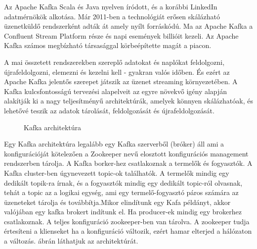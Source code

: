 
Az Apache Kafka Scala és Java nyelven íródott, és a korábbi LinkedIn adatmérnökök alkotása. Már 2011-ben a technológiát erősen skálázható üzenetküldő rendszerként adták át amely nyílt forráskódú. Ma az Apache Kafka a Confluent Stream Platform része és napi események billióit kezeli. Az Apache Kafka számos megbízható társasággal körbeépítette magát a piacon.

A mai összetett rendszerekben szereplő adatokat és naplókat feldolgozni, újrafeldolgozni, elemezni és kezelni kell - gyakran valós időben. És ezért az Apache Kafka jelentős szerepet játszik az üzenet streaming környezetében. A Kafka kulcsfontosságú tervezési alapelveit az egyre növekvő igény alapján alakítják ki a nagy teljesítményű architektúrák, amelyek könnyen skálázhatóak, és lehetővé teszik az adatok tárolását, feldolgozását és újrafeldolgozását.

 \begin{figure}[ht]
	\centering
	\caption{Kafka architektúra} 
	\label{fig:kafka-architecture}
\end{figure}
Egy Kafka architektúra legalább egy Kafka szerverből (bróker) áll ami a konfigurációját kötelezően a Zookeeper nevű elosztott konfigurációs management rendszerben tárolja.  A Kafka borker-hez csatlakoznak a termelők és fogyasztók. A Kafka cluster-ben úgynevezett topic-ok találhatók. A termelők mindig egy dedikált topik-ra írnak, és a fogyasztók mindig egy dedikált topic-ról olvasnak, tehát a topic az a logikai egység, ami egy termelő-fogyasztó páros számára az üzeneteket tárolja és továbbítja.Mikor elindítunk egy Kafa példányt, akkor valójában egy kafka brokert indítunk el. Ha producer-ek mindig egy brokerhez csatlakoznak. A teljes konfiguráció zookeeper-ben van tárolva. A zookeeper tudja értesíteni a klienseket ha a konfiguráció változik, ezért hamar elterjed a hálózaton a változás.  ábrán láthatjuk az architektúrát.\newline


